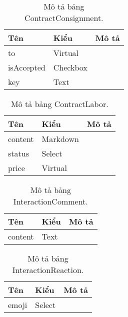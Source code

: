 
\begin{table}[p]
\begin{center}
\begin{tabular}{ |l|l|l| } 
	\hline
	Tên & Kiểu & Mô tả \\
	\hline
	to & Virtual & \dotfill \\
isAccepted & Checkbox & \dotfill \\
key & Text & \dotfill \\ 
	\hline
\end{tabular}
	\caption{Mô tả bảng ContractConsignment.}
	\label{table:ContractConsignment}
\end{center}
\end{table}


\begin{table}[p]
\begin{center}
\begin{tabular}{ |l|l|l| } 
	\hline
	Tên & Kiểu & Mô tả \\
	\hline
	content & Markdown & \dotfill \\
status & Select & \dotfill \\
price & Virtual & \dotfill \\ 
	\hline
\end{tabular}
	\caption{Mô tả bảng ContractLabor.}
	\label{table:ContractLabor}
\end{center}
\end{table}


\begin{table}[p]
\begin{center}
\begin{tabular}{ |l|l|l| } 
	\hline
	Tên & Kiểu & Mô tả \\
	\hline
	content & Text & \dotfill \\ 
	\hline
\end{tabular}
	\caption{Mô tả bảng InteractionComment.}
	\label{table:InteractionComment}
\end{center}
\end{table}


\begin{table}[p]
\begin{center}
\begin{tabular}{ |l|l|l| } 
	\hline
	Tên & Kiểu & Mô tả \\
	\hline
	emoji & Select & \dotfill \\ 
	\hline
\end{tabular}
	\caption{Mô tả bảng InteractionReaction.}
	\label{table:InteractionReaction}
\end{center}
\end{table}


